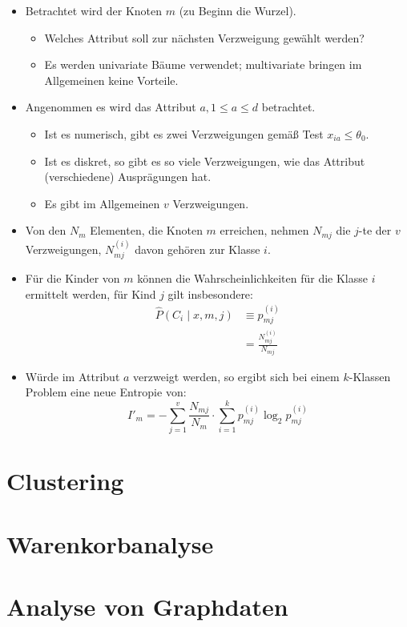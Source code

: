 \documentclass{scrartcl}
\begin{document}
\begin{itemize}
	\item Betrachtet wird der Knoten $ m $ (zu Beginn die Wurzel).
	\begin{itemize}
		\item Welches Attribut soll zur nächsten Verzweigung gewählt werden?
		\item Es werden univariate Bäume verwendet; multivariate bringen im 
		Allgemeinen keine Vorteile.
	\end{itemize}
	\item Angenommen es wird das Attribut $ a, 1 \leq a \leq d $ betrachtet.
	\begin{itemize}
		\item Ist es numerisch, gibt es zwei Verzweigungen gemäß Test $ x_{ia} 
		\leq \theta_0 $.
		\item Ist es diskret, so gibt es so viele Verzweigungen, wie das 
		Attribut (verschiedene) Ausprägungen hat.
		\item Es gibt im Allgemeinen $ v $ Verzweigungen.
	\end{itemize}
	\item Von den $ N_m $ Elementen, die Knoten $ m $ erreichen, nehmen $ 
	N_{mj} $ die $ j $-te der $ v $ Verzweigungen, $ N_{mj}^{(i)} $ davon 
	gehören zur Klasse $ i $.
	\item Für die Kinder von $ m $ können die Wahrscheinlichkeiten für die 
	Klasse $ i $ ermittelt werden, für Kind $ j $ gilt insbesondere:
	\begin{align*}
		\hat{P}(C_i \mid x,m,j) &\equiv p_{mj}^{(i)} \\
		&= \frac{N_{mj}^{(i)}}{N_{mj}}
	\end{align*}
	\item Würde im Attribut $ a $ verzweigt werden, so ergibt sich bei einem $ 
	k $-Klassen Problem eine neue Entropie von:
	\[ I'_m = -\sum_{j=1}^{v} \frac{N_{mj}}{N_m} \cdot \sum_{i=1}^{k} 
	p_{mj}^{(i)} \log_2 p_{mj}^{(i)} \]
\end{itemize}

\section{Clustering}

\section{Warenkorbanalyse}

\section{Analyse von Graphdaten}
\end{document}
